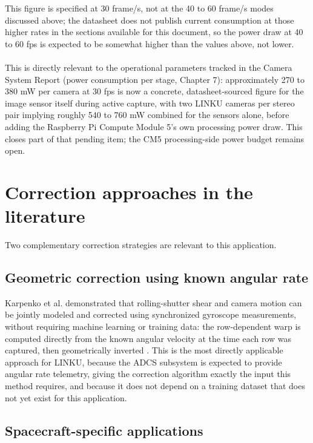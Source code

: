 This figure is specified at 30 frame/s, not at the 40 to 60 frame/s modes discussed above; the datasheet does not publish current consumption at those higher rates in the sections available for this document, so the power draw at 40 to 60 fps is expected to be somewhat higher than the values above, not lower. 
\\\\
This is directly relevant to the operational parameters tracked in the Camera System Report (power consumption per stage, Chapter 7): approximately 270 to 380 mW per camera at 30 fps is now a concrete, datasheet-sourced figure for the image sensor itself during active capture, with two LINKU cameras per stereo pair implying roughly 540 to 760 mW combined for the sensors alone, before adding the Raspberry Pi Compute Module 5's own processing power draw. This closes part of that pending item; the CM5 processing-side power budget remains open.

\section{Correction approaches in the literature}

Two complementary correction strategies are relevant to this application.

\subsection{Geometric correction using known angular rate}

Karpenko et al. demonstrated that rolling-shutter shear and camera motion can be jointly modeled and corrected using synchronized gyroscope measurements, without requiring machine learning or training data: the row-dependent warp is computed directly from the known angular velocity at the time each row was captured, then geometrically inverted \cite{karpenko2011rollingshutter}. This is the most directly applicable approach for LINKU, because the ADCS subsystem is expected to provide angular rate telemetry, giving the correction algorithm exactly the input this method requires, and because it does not depend on a training dataset that does not yet exist for this application.

\subsection{Spacecraft-specific applications}

